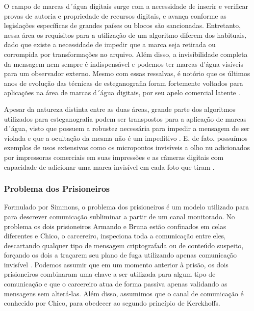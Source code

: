  O campo de marcas d´água digitais surge com a necessidade de inserir e verificar provas de autoria e propriedade de recursos digitais, e avança conforme as legislações específicas de grandes países ou blocos são sancionadas. Entretanto, nessa área os requisitos para a utilização de um algoritmo diferem dos habituais, dado que existe a necessidade de impedir que a marca seja retirada ou corrompida por transformações no arquivo. Além disso, a invisibilidade completa da mensagem nem sempre é indispensável e podemos ter marcas d'água visíveis para um observador externo. Mesmo com essas ressalvas, é notório que os últimos anos de evolução das técnicas de esteganografia foram fortemente voltados para aplicações na área de marcas d´água digitais, por seu apelo comercial latente \cite{9187785}.
 
 Apesar da natureza distinta entre as duas áreas, grande parte dos algoritmos utilizados para esteganografia podem ser transpostos para a aplicação de marcas d´água, visto que possuem a robustez necessária para impedir a mensagem de ser violada e que a ocultação da mesma não é um impeditivo \cite{9187785}. E, de fato, possuímos exemplos de usos extensivos como os micropontos invisíveis a olho nu adicionados por impressoras comerciais em suas impressões \cite{10.1145/2656434.2656437} e as câmeras digitais com capacidade de adicionar uma marca invisível em cada foto que tiram \cite{blythe}.

 \subsubsection{Problema dos Prisioneiros}

 Formulado por Simmons, o problema dos prisioneiros é um modelo utilizado para para descrever comunicação subliminar a partir de um canal monitorado. No problema os dois prisioneiros Armando e Bruna estão confinados em celas diferentes e Chico, o carcereiro, inspeciona toda a comunicação entre eles, descartando qualquer tipo de mensagem criptografada ou de conteúdo suspeito, forçando os dois a traçarem seu plano de fuga utilizando apenas comunicação invisível \cite{Simmons1984}. Podemos assumir que em um momento anterior à prisão, os dois prisioneiros combinaram uma chave a ser utilizada para algum tipo de comunicação e que o carcereiro atua de forma passiva apenas validando as mensagens sem alterá-las. Além disso, assumimos que o canal de comunicação é conhecido por Chico, para obedecer ao segundo princípio de Kerckhoffs.

